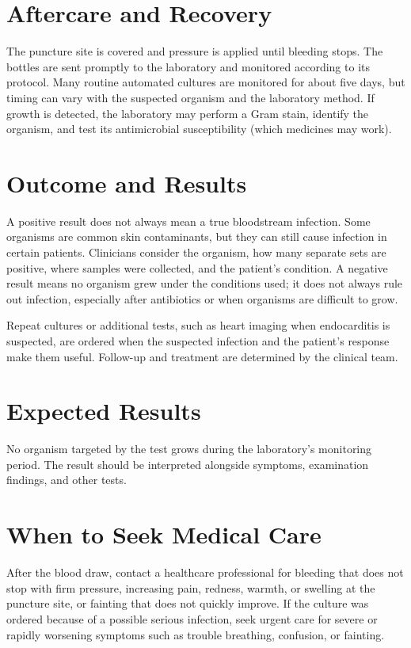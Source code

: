 \section*{Aftercare and Recovery}
The puncture site is covered and pressure is applied until bleeding stops. The bottles are sent promptly to the laboratory and monitored according to its protocol. Many routine automated cultures are monitored for about five days, but timing can vary with the suspected organism and the laboratory method. If growth is detected, the laboratory may perform a Gram stain, identify the organism, and test its antimicrobial susceptibility (which medicines may work).

\section*{Outcome and Results}
A positive result does not always mean a true bloodstream infection. Some organisms are common skin contaminants, but they can still cause infection in certain patients. Clinicians consider the organism, how many separate sets are positive, where samples were collected, and the patient's condition. A negative result means no organism grew under the conditions used; it does not always rule out infection, especially after antibiotics or when organisms are difficult to grow.

Repeat cultures or additional tests, such as heart imaging when endocarditis is suspected, are ordered when the suspected infection and the patient's response make them useful. Follow-up and treatment are determined by the clinical team.

\section*{Expected Results}
No organism targeted by the test grows during the laboratory's monitoring period. The result should be interpreted alongside symptoms, examination findings, and other tests.

\section*{When to Seek Medical Care}
After the blood draw, contact a healthcare professional for bleeding that does not stop with firm pressure, increasing pain, redness, warmth, or swelling at the puncture site, or fainting that does not quickly improve. If the culture was ordered because of a possible serious infection, seek urgent care for severe or rapidly worsening symptoms such as trouble breathing, confusion, or fainting.

